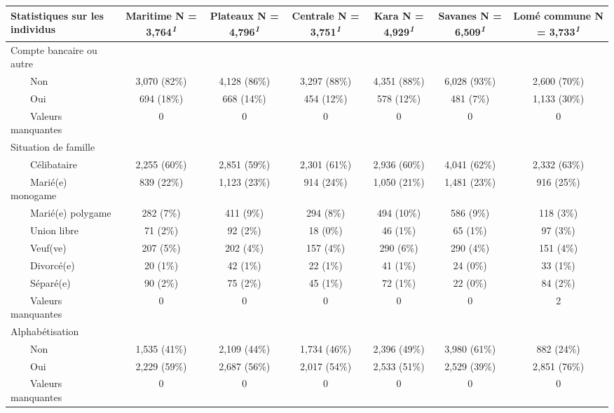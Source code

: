 \documentclass[
]{article}
\begin{document}
\begin{table}[!t]
\fontsize{12.0pt}{14.4pt}\selectfont
\begin{tabular*}{\linewidth}{@{\extracolsep{\fill}}lcccccc}
\toprule
Statistiques sur les individus & \textbf{Maritime}  N = 3,764\textsuperscript{\textit{1}} & \textbf{Plateaux}  N = 4,796\textsuperscript{\textit{1}} & \textbf{Centrale}  N = 3,751\textsuperscript{\textit{1}} & \textbf{Kara}  N = 4,929\textsuperscript{\textit{1}} & \textbf{Savanes}  N = 6,509\textsuperscript{\textit{1}} & \textbf{Lomé commune}  N = 3,733\textsuperscript{\textit{1}} \\ 
\midrule\addlinespace[2.5pt]
Compte bancaire ou autre &  &  &  &  &  &  \\ 
    Non & 3,070 (82\%) & 4,128 (86\%) & 3,297 (88\%) & 4,351 (88\%) & 6,028 (93\%) & 2,600 (70\%) \\ 
    Oui & 694 (18\%) & 668 (14\%) & 454 (12\%) & 578 (12\%) & 481 (7\%) & 1,133 (30\%) \\ 
    Valeurs manquantes & 0 & 0 & 0 & 0 & 0 & 0 \\ 
Situation de famille &  &  &  &  &  &  \\ 
    Célibataire & 2,255 (60\%) & 2,851 (59\%) & 2,301 (61\%) & 2,936 (60\%) & 4,041 (62\%) & 2,332 (63\%) \\ 
    Marié(e) monogame & 839 (22\%) & 1,123 (23\%) & 914 (24\%) & 1,050 (21\%) & 1,481 (23\%) & 916 (25\%) \\ 
    Marié(e) polygame & 282 (7\%) & 411 (9\%) & 294 (8\%) & 494 (10\%) & 586 (9\%) & 118 (3\%) \\ 
    Union libre & 71 (2\%) & 92 (2\%) & 18 (0\%) & 46 (1\%) & 65 (1\%) & 97 (3\%) \\ 
    Veuf(ve) & 207 (5\%) & 202 (4\%) & 157 (4\%) & 290 (6\%) & 290 (4\%) & 151 (4\%) \\ 
    Divorcé(e) & 20 (1\%) & 42 (1\%) & 22 (1\%) & 41 (1\%) & 24 (0\%) & 33 (1\%) \\ 
    Séparé(e) & 90 (2\%) & 75 (2\%) & 45 (1\%) & 72 (1\%) & 22 (0\%) & 84 (2\%) \\ 
    Valeurs manquantes & 0 & 0 & 0 & 0 & 0 & 2 \\ 
Alphabétisation &  &  &  &  &  &  \\ 
    Non & 1,535 (41\%) & 2,109 (44\%) & 1,734 (46\%) & 2,396 (49\%) & 3,980 (61\%) & 882 (24\%) \\ 
    Oui & 2,229 (59\%) & 2,687 (56\%) & 2,017 (54\%) & 2,533 (51\%) & 2,529 (39\%) & 2,851 (76\%) \\ 
    Valeurs manquantes & 0 & 0 & 0 & 0 & 0 & 0 \\ 

\end{tabular*}
\end{table}
\end{document}
